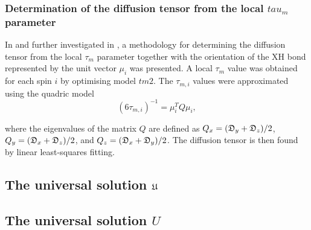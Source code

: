\begin{htmlonly}
\begin{htmlonly}
\begin{htmlonly}
    \subsubsection{Determination of the diffusion tensor from the local $tau_m$ parameter}
\end{htmlonly}

In \citet{Bruschweiler95} and further investigated in \citet{Lee97}, a methodology for determining the diffusion tensor from the local $\tau_m$ parameter together with the orientation of the XH bond represented by the unit vector $\mu_i$ was presented.
A local $\tau_m$ value was obtained for each spin $i$ by optimising model $tm2$.
The $\tau_{m,i}$ values were approximated using the quadric model
\begin{equation} \label{eq: quadric}
 (6 \tau_{m,i})^{-1} = \mu_i^T Q \mu_i,
\end{equation}

\noindent where the eigenvalues of the matrix $Q$ are defined as $Q_x = (\mathfrak{D}_y + \mathfrak{D}_z)/2$, $Q_y = (\mathfrak{D}_x + \mathfrak{D}_z)/2$, and $Q_z = (\mathfrak{D}_x + \mathfrak{D}_y)/2$.
The diffusion tensor is then found by linear least-squares fitting.




\begin{latexonly}
    \subsection{The universal solution $\mathfrak{U}$}
\end{latexonly}
\begin{htmlonly}
    \subsection{The universal solution $U$}
\end{htmlonly}
\label{sect: universal solution}


\end{htmlonly}
\end{htmlonly}
